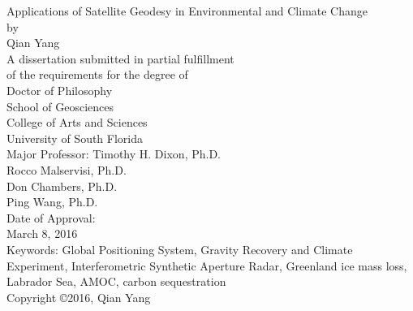 \begin{titlepage}
\begin{center}
\singlespacing
{ \vspace*{\baselineskip} }
{ \vspace*{\baselineskip} }
{ \vspace*{\baselineskip} }
{ \vspace*{\baselineskip} }
Applications of Satellite Geodesy in Environmental and Climate Change\\
{ \vspace*{\baselineskip} }
{ \vspace*{\baselineskip} }
{ \vspace*{\baselineskip} }
by\\
{ \vspace*{\baselineskip} }
{ \vspace*{\baselineskip} }
{ \vspace*{\baselineskip} }
Qian Yang\\
{ \vspace*{\baselineskip} }
{ \vspace*{\baselineskip} }
{ \vspace*{\baselineskip} }
{ \vspace*{\baselineskip} }
A dissertation submitted in partial fulfillment\\
of the requirements for the degree of\\
Doctor of Philosophy\\
School of Geosciences\\
College of Arts and Sciences\\
University of South Florida\\
{ \vspace*{\baselineskip} }
{ \vspace*{\baselineskip} }
{ \vspace*{\baselineskip} }
Major Professor: Timothy H. Dixon, Ph.D.\\
Rocco Malservisi, Ph.D.\\
Don Chambers, Ph.D.\\
Ping Wang, Ph.D.\\
{ \vspace*{\baselineskip} }
{ \vspace*{\baselineskip} }
Date of Approval:\\
March 8, 2016\\
{ \vspace*{\baselineskip} }
{ \vspace*{\baselineskip} }
{ \vspace*{\baselineskip} }
Keywords: Global Positioning System, Gravity Recovery and Climate Experiment, Interferometric Synthetic Aperture Radar, Greenland ice mass loss, Labrador Sea, AMOC, carbon sequestration\\
{ \vspace*{\baselineskip} }
Copyright \copyright\hspace{1mm}2016, Qian Yang\\
\end{center}
\end{titlepage}